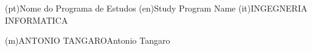 \ntdegreename*(pt){Nome do Programa de Estudos}
\ntdegreename*(en){Study Program Name}
\ntdegreename*(it){INGEGNERIA INFORMATICA}




\ntauthorname(m){ANTONIO TANGARO}{Antonio Tangaro}

